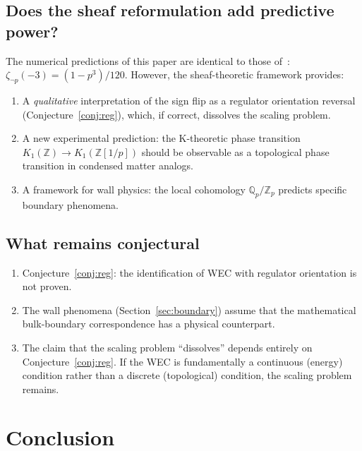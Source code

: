 \documentclass[aps,prd,twocolumn,superscriptaddress,nofootinbib]{revtex4-2}
\newcommand{\Zp}{\mathbb{Z}[1/p]}
\newcommand{\Qp}{\mathbb{Q}_p}
\begin{document}
\subsection{Does the sheaf reformulation add predictive power?}

The numerical predictions of this paper are identical to
those of~\cite{paper_A}: $\zeta_{\neg p}(-3) = (1-p^3)/120$.
However, the sheaf-theoretic framework provides:
\begin{enumerate}
  \item A \emph{qualitative} interpretation of the sign flip
    as a regulator orientation reversal (Conjecture~\ref{conj:reg}),
    which, if correct, dissolves the scaling problem.
  \item A new experimental prediction: the K-theoretic phase
    transition $K_1(\mathbb{Z}) \to K_1(\Zp)$ should be
    observable as a topological phase transition in
    condensed matter analogs.
  \item A framework for wall physics: the local cohomology
    $\Qp/\mathbb{Z}_p$ predicts specific boundary phenomena.
\end{enumerate}

\subsection{What remains conjectural}

\begin{enumerate}
  \item Conjecture~\ref{conj:reg}: the identification of WEC
    with regulator orientation is not proven.
  \item The wall phenomena (Section~\ref{sec:boundary}) assume
    that the mathematical bulk-boundary correspondence has
    a physical counterpart.
  \item The claim that the scaling problem ``dissolves'' depends
    entirely on Conjecture~\ref{conj:reg}. If the WEC is
    fundamentally a continuous (energy) condition rather than
    a discrete (topological) condition, the scaling problem
    remains.
\end{enumerate}

\section{Conclusion}
\label{sec:conclusion}
\end{document}

